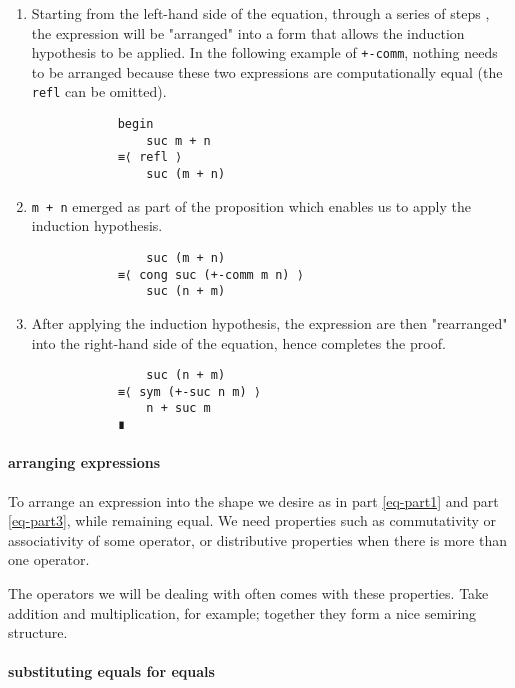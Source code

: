 \documentclass[../thesis.tex]{subfiles}
\begin{document}
\begin{enumerate}
    \item\label{eq-part1}
        Starting from the left-hand side of the equation, through a series of steps
        , the expression will be "arranged" into a form that allows the induction
        hypothesis to be applied.
        In the following example of {\lstinline|+-comm|}, nothing needs to be arranged
        because these two expressions are computationally equal
        (the {\lstinline|refl|} can be omitted).

        \begin{lstlisting}
            begin
                suc m + n
            ≡⟨ refl ⟩
                suc (m + n)
        \end{lstlisting}
    \item\label{eq-part2}
        {\lstinline|m + n|} emerged as part of the proposition which enables us
        to apply the induction hypothesis.

        \begin{lstlisting}
                suc (m + n)
            ≡⟨ cong suc (+-comm m n) ⟩
                suc (n + m)
        \end{lstlisting}
    \item\label{eq-part3}
        After applying the induction hypothesis, the expression are then "rearranged"
        into the right-hand side of the equation, hence completes the proof.

        \begin{lstlisting}
                suc (n + m)
            ≡⟨ sym (+-suc n m) ⟩
                n + suc m
            ∎
        \end{lstlisting}
\end{enumerate}

\paragraph{arranging expressions}

To arrange an expression into the shape we desire as in part \ref{eq-part1} and
part \ref{eq-part3}, while remaining equal.
We need properties such as commutativity or associativity of some operator,
or distributive properties when there is more than one operator.

The operators we will be dealing with often comes with these properties.
Take addition and multiplication, for example;
together they form a nice semiring structure.

\paragraph{substituting equals for equals}
\end{document}
